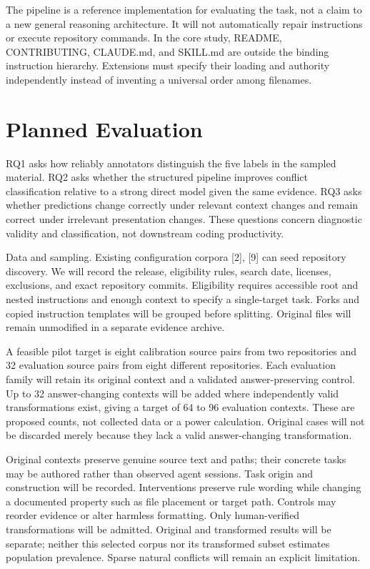 \documentclass[10pt,conference]{IEEEtran}
\begin{document}
The pipeline is a reference implementation for evaluating the task, not a claim to a new general reasoning architecture. It will not automatically repair instructions or execute repository commands. In the core study, README, CONTRIBUTING, CLAUDE.md, and SKILL.md are outside the binding instruction hierarchy. Extensions must specify their loading and authority independently instead of inventing a universal order among filenames.


\section{Planned Evaluation}

RQ1 asks how reliably annotators distinguish the five labels in the sampled material. RQ2 asks whether the structured pipeline improves conflict classification relative to a strong direct model given the same evidence. RQ3 asks whether predictions change correctly under relevant context changes and remain correct under irrelevant presentation changes. These questions concern diagnostic validity and classification, not downstream coding productivity.


Data and sampling. Existing configuration corpora [2], [9] can seed repository discovery. We will record the release, eligibility rules, search date, licenses, exclusions, and exact repository commits. Eligibility requires accessible root and nested instructions and enough context to specify a single-target task. Forks and copied instruction templates will be grouped before splitting. Original files will remain unmodified in a separate evidence archive.


A feasible pilot target is eight calibration source pairs from two repositories and 32 evaluation source pairs from eight different repositories. Each evaluation family will retain its original context and a validated answer-preserving control. Up to 32 answer-changing contexts will be added where independently valid transformations exist, giving a target of 64 to 96 evaluation contexts. These are proposed counts, not collected data or a power calculation. Original cases will not be discarded merely because they lack a valid answer-changing transformation.


Original contexts preserve genuine source text and paths; their concrete tasks may be authored rather than observed agent sessions. Task origin and construction will be recorded. Interventions preserve rule wording while changing a documented property such as file placement or target path. Controls may reorder evidence or alter harmless formatting. Only human-verified transformations will be admitted. Original and transformed results will be separate; neither this selected corpus nor its transformed subset estimates population prevalence. Sparse natural conflicts will remain an explicit limitation.
\end{document}
